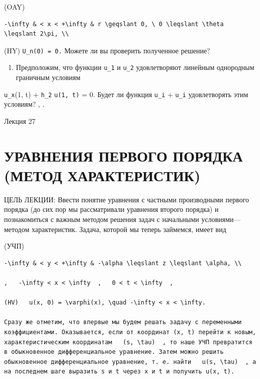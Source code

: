 \documentclass[
  ukrainian,
]{article}
\providecommand{\tightlist}{%
  \setlength{\itemsep}{0pt}\setlength{\parskip}{0pt}}
\begin{document}
(OAY)

\begin{verbatim}
-\infty & < x < +\infty & r \geqslant 0, \ 0 \leqslant \theta \leqslant 2\pi, \\
\end{verbatim}

(HY) \texttt{U\_n(0)\ =\ 0.} Можете ли вы проверить полученное решение?

\begin{enumerate}
\def\labelenumi{\arabic{enumi}.}
\setcounter{enumi}{5}
\tightlist
\item
  Предположим, что функции \texttt{u\_1} и \texttt{u\_2} удовлетворяют
  линейным однородным граничным условиям
\end{enumerate}

\texttt{u\_x}(1, t) + \texttt{h\_2} \texttt{u(1,\ t)} = 0. Будет ли
функция \texttt{u\_i} + \texttt{u\_i} удовлетворять этим условиям? , .

Лекция 27

\section{УРАВНЕНИЯ ПЕРВОГО ПОРЯДКА (МЕТОД
ХАРАКТЕРИСТИК)}\label{ux443ux440ux430ux432ux43dux435ux43dux438ux44f-ux43fux435ux440ux432ux43eux433ux43e-ux43fux43eux440ux44fux434ux43aux430-ux43cux435ux442ux43eux434-ux445ux430ux440ux430ux43aux442ux435ux440ux438ux441ux442ux438ux43a}

ЦЕЛЬ ЛЕКЦИИ: Ввести понятие уравнения с частными производными первого
порядка (до сих пор мы рассматривали уравнения второго порядка) и
познакомиться с важным методом решения задач с начальными
условиями---методом характеристик. Задача, которой мы теперь займемся,
имеет вид

(УЧП)

\begin{verbatim}
-\infty & < y < +\infty & -\alpha \leqslant z \leqslant \alpha, \\

,   -\infty < x < \infty  ,   0 < t < \infty  ,

(HV)   u(x, 0) = \varphi(x), \quad -\infty < x < \infty.

Сразу же отметим, что впервые мы будем решать задачу с переменными коэффициентами. Оказывается, если от координат (x, t) перейти к новым, характеристическим координатам   (s, \tau)  , то наше УЧП превратится в обыкновенное дифференциальное уравнение. Затем можно решить обыкновенное дифференциальное уравнение, т. е. найти   u(s, \tau)  , а на последнем шаге выразить s и t через x и t и получить u(x, t).
\end{verbatim}
\end{document}
